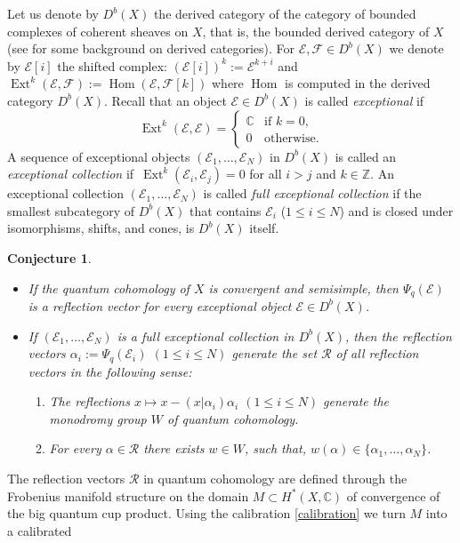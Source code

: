 \documentclass[pdftex]{sigma}
\numberwithin{equation}{section}
\newtheorem{Conjecture}[Theorem]{Conjecture}
 { \theoremstyle{definition}
\newtheorem{Definition}[Theorem]{Definition}
\newtheorem{Note}[Theorem]{Note}
\newtheorem{Example}[Theorem]{Example}
\newtheorem{Remark}[Theorem]{Remark} }
\newcommand{\CC}{\mathbb{C}}
\newcommand{\ZZ}{\mathbb{Z}}
\newcommand{\F}{\mathcal{F}}
\newcommand{\E}{\mathcal{E}}
\begin{document}
Let us denote by $D^b(X)$
the derived category of the category of bounded complexes of coherent
sheaves on $X$, that is, the bounded derived category of $X$ (see
\cite{GM} for some background on derived categories). For $\E, \F \in
D^b(X)$ we denote by $\E[i]$ the shifted complex:
$(\E[i])^k:=\E^{k+i}$ and
$
\operatorname{Ext}^k(\E,\F):=\operatorname{Hom}(\E,\F[k])
$
where $\operatorname{Hom}$ is computed in the derived category
$D^b(X)$. Recall that an object $\E\in D^b(X)$ is called {\em
 exceptional} if
\[
\operatorname{Ext}^k(\E,\E)=
\begin{cases}
 \CC & \mbox{if } k=0,\\
 0 & \mbox{otherwise}.
\end{cases}
\]
A sequence of exceptional objects $(\E_1,\dots,\E_N)$ in $D^b(X)$ is called an
{\em exceptional collection} if~$\operatorname{Ext}^k(\E_i,\E_j)=0$
for all $i>j$ and $k\in \ZZ$. An exceptional collection
$(\E_1,\dots,\E_N)$ is called {\em full exceptional collection} if the
smallest subcategory of $D^b(X)$ that
contains $\E_i$ ($1\leq i\leq N$) and is closed under isomorphisms,
shifts, and cones, is $D^b(X)$ itself.
\begin{Conjecture}\label{conj:rv}\quad
\begin{itemize}\itemsep=0pt
\item[$(a)$] If the quantum cohomology of $X$ is convergent and semisimple,
 then $\Psi_q(\E)$ is a reflection vector for every exceptional
 object $\E\in D^b(X)$.
\item[$(b)$] If $(\E_1,\dots, \E_N)$ is a full exceptional collection in
 $D^b(X)$, then the reflection vectors $\alpha_i:=\Psi_q(\E_i)$
 $(1\leq i\leq N)$ generate the set $\mathcal{R}$ of all reflection
 vectors in the following sense:
 \begin{enumerate}\itemsep=0pt
 \item[$(i)$]
 The reflections $x\mapsto x-(x|\alpha_i) \alpha_i$ $(1\leq i\leq
 N)$ generate the monodromy group $W$ of quantum cohomology.
 \item[$(ii)$]
 For every $\alpha\in \mathcal{R}$ there exists $w\in W$, such
 that, $w(\alpha) \in \{\alpha_1,\dots,\alpha_N\}$.
 \end{enumerate}
 \end{itemize}
 \end{Conjecture}
The reflection vectors $\mathcal{R}$ in quantum cohomology are defined
through the Frobenius manifold structure on the domain $M\subset
H^*(X,\CC)$ of convergence of the big quantum cup product. Using the
calibration \eqref{calibration} we turn $M$ into a calibrated
\end{document}

